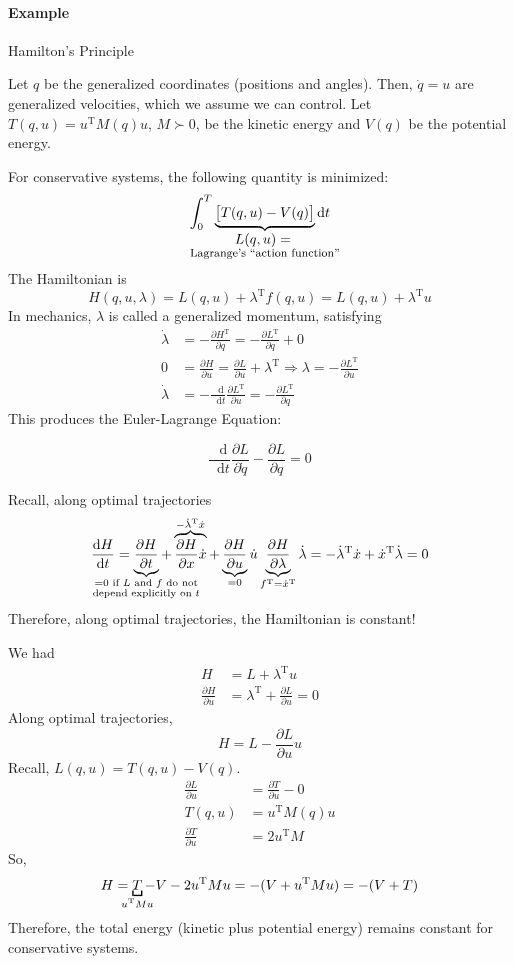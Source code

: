 \documentclass[letterpaper,12pt,titlepage]{report}
\newcommand*\dif{\mathop{}\!\mathrm{d}}
\newcommand{\trans}{^\text{T}}
\newcommand*\pder[2]{\frac{\partial #1}{\partial #2}}
\theoremstyle{plain}
\theoremstyle{definition}
\begin{document}
\paragraph{Example} Hamilton's Principle

Let $q$ be the generalized coordinates (positions and angles). Then, $\dot q = u$ are generalized velocities, which we assume we can control. Let $T(q,u)=u\trans M(q) u$, $M\succ0$, be the kinetic energy and $V(q)$ be the potential energy.

For conservative systems, the following quantity is minimized:
\[ \int_0^T \underbrace{\big[ T(q,u) - V(q) \big]}_{\mathclap{\substack{\displaystyle L(q,u)={}\\ \text{\footnotesize Lagrange's ``action function''}}}} \dif t \]
The Hamiltonian is
\[ H(q,u,\lambda) = L(q,u) + \lambda\trans f(q,u) = L(q,u) + \lambda\trans u \]
In mechanics, $\lambda$ is called a generalized momentum, satisfying
\begin{align}
  \dot\lambda &= -\pder{H\trans}{q} = -\pder{L\trans}{q} + 0 \\
  0 &= \pder{H}{u} = \pder{L}{u} + \lambda\trans \Longrightarrow \lambda = -\pder{L\trans}{u} \\
  \dot\lambda &= -\frac{\dif}{\dif t} \pder{L\trans}{u} = -\pder{L\trans}{q}
\end{align}
This produces the Euler-Lagrange Equation:
\begin{framed}
  \[
    \frac{\dif}{\dif t} \pder{L}{\dot q} - \pder{L}{q} = 0
  \]
\end{framed}

Recall, along optimal trajectories
\[
  \frac{\dif H}{\dif t} = \underbrace{\pder{H}{t}}_{\mathclap{\substack{=0 \text{ if $L$ and $f$ do not}\\ \text{depend explicitly on $t$}}}} + \overbrace{\pder{H}{x}\dot x}^{-\dot\lambda\trans\dot x} + \underbrace{\pder{H}{u}}_{=0}\dot u \underbrace{\pder{H}{\lambda}}_{f\trans=\dot x\trans}\dot\lambda = -\dot\lambda\trans\dot x + \dot x\trans\dot\lambda = 0
\]
Therefore, along optimal trajectories, the Hamiltonian is constant!

We had
\begin{align}
  H &= L + \lambda\trans u \\
  \pder{H}{u} &= \lambda\trans + \pder{L}{u} = 0
\end{align}
Along optimal trajectories,
\[ H = L - \pder{L}{u} u \]
Recall, $L(q,u)=T(q,u)-V(q)$.
\begin{align}
  \pder{L}{u} &= \pder{T}{u} - 0 \\
  T(q,u) &= u\trans M(q) u \\
  \pder{T}{u} &= 2u\trans M
\end{align}
So,
\[ H = \underbracket[1pt]{T}_{\mathclap{u\trans Mu}} - V - 2u\trans M u = -(V + u\trans M u) = -(V+T) \]
Therefore, the total energy (kinetic plus potential energy) remains constant for conservative systems.
\end{document}
